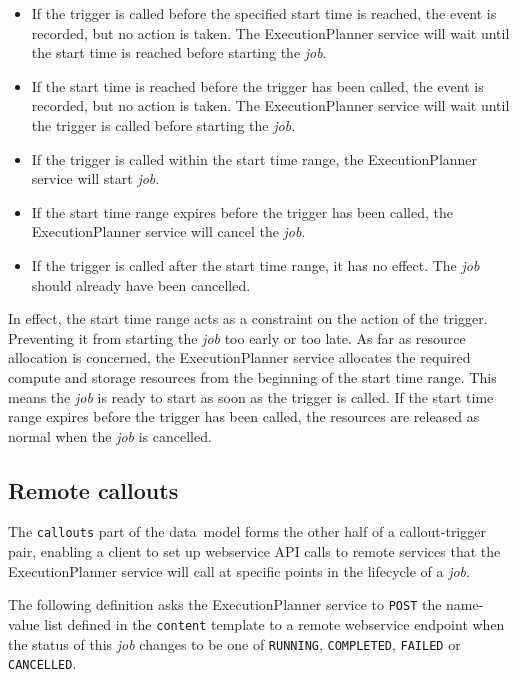 \documentclass[11pt,a4paper]{ivoa}
\newcommand{\datamodel} {data~model}
\newcommand{\webservice} {webservice}
\newcommand{\execplanner} {ExecutionPlanner}
\newcommand{\codeword}[1] {\texttt{#1}}
\newcommand{\job} {\textit{job}}
\begin{document}
\begin{itemize}
    \item If the trigger is called before the specified start time is reached, the event is recorded,
    but no action is taken.
    The \execplanner{} service will wait until the start time is reached before starting the \job{}.
    \item If the start time is reached before the trigger has been called, the event is recorded,
    but no action is taken. The \execplanner{} service will wait until the trigger is called before starting the \job{}.
    \item If the trigger is called within the start time range, the \execplanner{} service will start \job{}.
    \item If the start time range expires before the trigger has been called, the \execplanner{} service will cancel the \job{}.
    \item If the trigger is called after the start time range, it has no effect. The \job{} should already have been cancelled.
\end{itemize}

In effect, the start time range acts as a constraint on the action of the trigger. Preventing it from starting the \job{} too early
or too late.
As far as resource allocation is concerned, the \execplanner{} service allocates the required compute and storage resources
from the beginning of the start time range. This means the \job{} is ready to start as soon as the trigger is called.
If the start time range expires before the trigger has been called, the resources are released as normal
when the \job{} is cancelled.

\subsection{Remote callouts}
\label{callouts}

The \codeword{callouts} part of the \datamodel{} forms the other half of a callout-trigger pair,
enabling a client to set up \webservice{} API calls to remote services that the \execplanner{} service will
call at specific points in the lifecycle of a \job{}.

The following definition asks the \execplanner{} service to \codeword{POST} the name-value list defined in the
\codeword{content} template to a remote \webservice{} endpoint when the status of this \job{} changes to be one
of \codeword{RUNNING}, \codeword{COMPLETED}, \codeword{FAILED} or \codeword{CANCELLED}.
\end{document}
